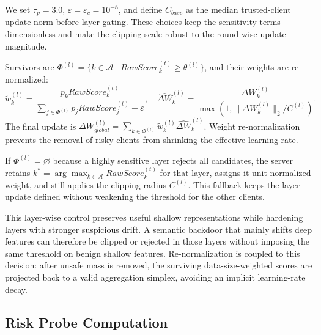 \documentclass[runningheads,orivec]{llncs}
\begin{document}
We set $\tau_p=3.0$, $\varepsilon=\varepsilon_c=10^{-8}$, and define $C_{base}$ as the median trusted-client update norm before layer gating. These choices keep the sensitivity terms dimensionless and make the clipping scale robust to the round-wise update magnitude.

Survivors are $\Phi^{(l)}=\{k\in\mathcal{A}\mid RawScore_k^{(t)}\ge\theta^{(l)}\}$, and their weights are re-normalized:
\begin{equation}
    \tilde{w}_{k}^{(l)}=\frac{p_kRawScore_k^{(t)}}{\sum_{j\in\Phi^{(l)}}p_jRawScore_j^{(t)}+\varepsilon},\quad
    \widehat{\Delta W}_k^{(l)}=\frac{\Delta W_k^{(l)}}{\max(1,\|\Delta W_k^{(l)}\|_2/C^{(l)})}.
\end{equation}
The final update is $\Delta W_{global}^{(l)}=\sum_{k\in\Phi^{(l)}}\tilde{w}_{k}^{(l)}\widehat{\Delta W}_k^{(l)}$. Weight re-normalization prevents the removal of risky clients from shrinking the effective learning rate.

If $\Phi^{(l)}=\varnothing$ because a highly sensitive layer rejects all candidates, the server retains $k^*=\arg\max_{k\in\mathcal{A}}RawScore_k^{(t)}$ for that layer, assigns it unit normalized weight, and still applies the clipping radius $C^{(l)}$. This fallback keeps the layer update defined without weakening the threshold for the other clients.

This layer-wise control preserves useful shallow representations while hardening layers with stronger suspicious drift. A semantic backdoor that mainly shifts deep features can therefore be clipped or rejected in those layers without imposing the same threshold on benign shallow features. Re-normalization is coupled to this decision: after unsafe mass is removed, the surviving data-size-weighted scores are projected back to a valid aggregation simplex, avoiding an implicit learning-rate decay.

\subsection{Risk Probe Computation}
\end{document}
